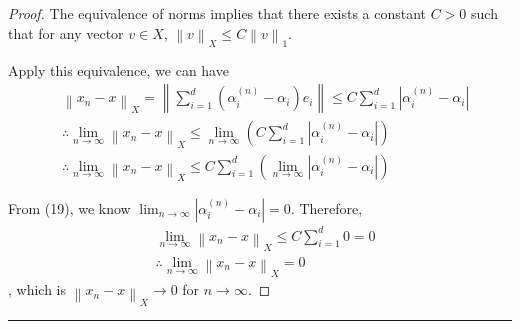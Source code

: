 \documentclass{article}
\newcommand{\norm}[1]{\left\|#1\right\|}
\begin{document}
\begin{proof}
    The equivalence of norms implies that there exists a constant $C > 0$ such that for any vector $v \in X$, $\norm{v}_X \le C \norm{v}_1$.
    
    Apply this equivalence, we can have
    \begin{align}
        &\norm{x_n - x}_X 
        = \norm{\sum_{i=1}^d (\alpha_i^{(n)} - \alpha_i) e_i}
        \le C \sum_{i=1}^d |\alpha_i^{(n)} - \alpha_i|
        \\
        &\therefore
        \lim_{n\to\infty} \norm{x_n - x}_X 
        \le \lim_{n\to\infty} \left( C \sum_{i=1}^d |\alpha_i^{(n)} - \alpha_i| \right)
        \\
        &\therefore
        \lim_{n\to\infty} \norm{x_n - x}_X 
        \le C \sum_{i=1}^d \left( \lim_{n\to\infty} |\alpha_i^{(n)} - \alpha_i| \right)
    \end{align}
    
    From (19), we know $\lim_{n\to\infty} |\alpha_i^{(n)} - \alpha_i| = 0$. Therefore,
    \begin{align}
        &\lim_{n\to\infty} \norm{x_n - x}_X 
        \le C \sum_{i=1}^d 0 
        = 0
        \\
        &\therefore
        \lim_{n\to\infty} \norm{x_n - x}_X = 0
    \end{align}
    , which is $\norm{x_n - x}_X \to 0$ for $n \to \infty$.
\end{proof}


\hrule
\vspace{0.5em}


\end{document}
